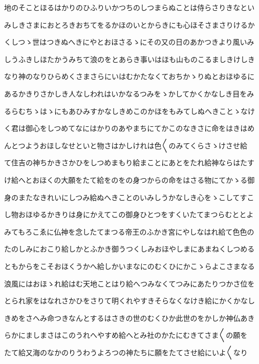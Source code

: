 \documentclass[a4paper,11pt,landscape]{ltjtarticle}
\begin{document}
\par\medskip
地のそことほるはかりのひふりいかつちのしつまらぬことは侍らさりきなとい
\par\medskip
みしきさまにおとろきおちてをるかほのいとからきにも心ほそさまさりけるか
\par\medskip
くしつゝ世はつきぬへきにやとおほさるゝにその又の日のあかつきより風いみ
\par\medskip
しうふきしほたかうみちて浪のをとあらき事いはほも山ものこるましきけしき
\par\medskip
なり神のなりひらめくさまさらにいはむかたなくておちかゝりぬとおほゆるに
\par\medskip
あるかきりさかしき人なしわれはいかなるつみをゝかしてかくかなしき目をみ
\par\medskip
るらむちゝはゝにもあひみすかなしきめこのかほをもみてしぬへきことゝなけ
\par\medskip
く君は御心をしつめてなにはかりのあやまちにてかこのなきさに命をはきはめ
\par\medskip
んとつようおほしなせといと物さはかしけれは色〱のみてくらさゝけさせ給
\par\medskip
て住吉の神ちかきさかひをしつめまもり給まことにあとをたれ給神ならはたす
\par\medskip
け給へとおほくの大願をたて給をのをの身つからの命をはさる物にてかゝる御
\par\medskip
身のまたなきれいにしつみ給ぬへきことのいみしうかなしき心をゝこしてすこ
\par\medskip
し物おほゆるかきりは身にかえてこの御身ひとつをすくいたてまつらむととよ
\par\medskip
みてもろこゑに仏神を念したてまつる帝王のふかき宮にやしなはれ給て色色の
\par\medskip
たのしみにおこり給しかとふかき御うつくしみおほやしまにあまねくしつめる
\par\medskip
ともからをこそおほくうかへ給しかいまなにのむくひにかこゝらよこさまなる
\par\medskip
浪風にはおほゝれ給はむ天地ことはり給へつみなくてつみにあたりつかさ位を
\par\medskip
とられ家をはなれさかひをさりて明くれやすきそらなくなけき給にかくかなし
\par\medskip
きめをさへみ命つきなんとするはさきの世のむくひか此世のをかしか神仏あき
\par\medskip
らかにましまさはこのうれへやすめ給へとみ社のかたにむきてさま〱の願を
\par\medskip
たて給又海のなかのりうわうよろつの神たちに願をたてさせ給にいよ〱なり
\par\medskip
\end{document}

